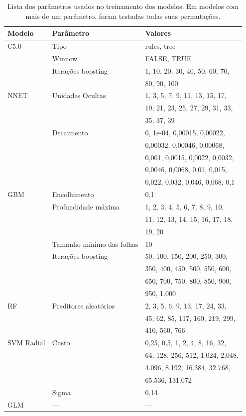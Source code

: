 \documentclass[a4paper,titlepage]{ppgi}\usepackage[]{graphicx}\usepackage[]{color}
\begin{document}
\begin{longtable}{l l l}
\caption{Lista dos parâmetros usados no treinamento dos modelos. Em modelos com
mais de um parâmetro, foram testadas todas suas permutações.} \\
\centering
  Modelo & Parâmetro & Valores \\
  \hline
  C5.0 & Tipo & rules, tree \\
   & Winnow & FALSE, TRUE \\
   & Iterações boosting & 1, 10, 20, 30, 40, 50, 60, 70, \\
 &  & 80, 90, 100 \\
  NNET & Unidades Ocultas & 1, 3, 5, 7, 9, 11, 13, 15, 17, \\
 &  & 19, 21, 23, 25, 27, 29, 31, 33, \\
 &  & 35, 37, 39 \\
   & Decaimento & 0, 1e-04, 0,00015, 0,00022, \\
 &  & 0,00032, 0,00046, 0,00068, \\
 &  & 0,001, 0,0015, 0,0022, 0,0032, \\
 &  & 0,0046, 0,0068, 0,01, 0,015, \\
 &  & 0,022, 0,032, 0,046, 0,068, 0,1 \\
  GBM & Encolhimento & 0,1 \\
   & Profundidade máxima & 1, 2, 3, 4, 5, 6, 7, 8, 9, 10, \\
 &  & 11, 12, 13, 14, 15, 16, 17, 18, \\
 &  & 19, 20 \\
   & Tamanho mínimo das folhas & 10 \\
   & Iterações boosting & 50, 100, 150, 200, 250, 300, \\
 &  & 350, 400, 450, 500, 550, 600, \\
 &  & 650, 700, 750, 800, 850, 900, \\
 &  & 950, 1.000 \\
  RF & Preditores aleatórios & 2, 3, 5, 6, 9, 13, 17, 24, 33, \\
 &  & 45, 62, 85, 117, 160, 219, 299, \\
 &  & 410, 560, 766 \\
  SVM Radial & Custo & 0,25, 0,5, 1, 2, 4, 8, 16, 32, \\
 &  & 64, 128, 256, 512, 1.024, 2.048, \\
 &  & 4.096, 8.192, 16.384, 32.768, \\
 &  & 65.536, 131.072 \\
   & Sigma & 0,14 \\
  GLM & --- & --- \\
\end{longtable}
\end{document}
